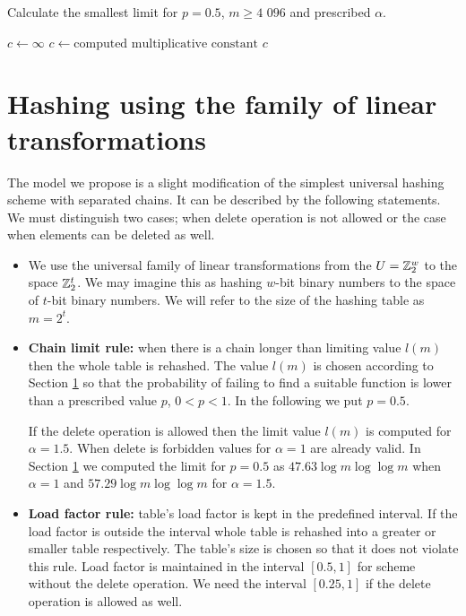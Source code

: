 \begin{algorithm}
\caption{Calculate the smallest limit for $p=0.5$, $m \geq \text{4 096}$ and prescribed $\alpha$.}
\label{algorithm-scheme-3}
\begin{algorithmic}
\STATE $c \leftarrow \infty$
				\STATE $c \leftarrow \text{computed multiplicative constant}$
			\ENDIF
		\ENDFOR
	\ENDFOR
\ENDFOR
\STATE
\RETURN $c$
\end{algorithmic}
\end{algorithm}

\section{Hashing using the family of linear transformations}
\label{section-hashing-linear-transformations}
The model we propose is a slight modification of the simplest universal hashing scheme with separated chains. It can be described by the following statements. We must distinguish two cases; when delete operation is not allowed or the case when elements can be deleted as well.
\begin{itemize}
\item We use the universal family of linear transformations from the $U = \mathbb{Z}_{2}^{w}$ to the space $\mathbb{Z}_{2}^{t}$. We may imagine this as hashing $w$-bit binary numbers to the space of $t$-bit binary numbers. We will refer to the size of the hashing table as $m = 2 ^ t$.
\item \textbf{Chain limit rule:} when there is a chain longer than limiting value $l(m)$ then the whole table is rehashed. The value $l(m)$ is chosen according to Section \ref{section-hashing-linear-transformations} so that the probability of failing to find a suitable function is lower than a prescribed value $p$, $0 < p < 1$. In the following we put $p = 0.5$. 

If the delete operation is allowed then the limit value $l(m)$ is computed for $\alpha = 1.5$. When delete is forbidden values for $\alpha = 1$ are already valid. In Section \ref{section-hashing-linear-transformations} we computed the limit for $p = 0.5$ as $47.63 \log m \log \log m$ when $\alpha = 1$ and $57.29 \log m \log \log m$ for $\alpha = 1.5$.
\item \textbf{Load factor rule:} table's load factor is kept in the predefined interval. If the load factor is outside the interval whole table is rehashed into a greater or smaller table respectively. The table's size is chosen so that it does not violate this rule. Load factor is maintained in the interval $\left[0.5, 1\right]$ for scheme without the delete operation. We need the interval $\left[0.25, 1\right]$ if the delete operation is allowed as well.
\end{itemize}


